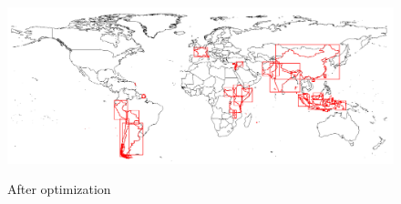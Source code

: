\documentclass[utf8]{article}
\begin{document}
\begin{large}
  \begin{figure}[h]
    \caption{After optimization}
    \includegraphics[width=\textwidth]{afterOpti.png}\label{fig:afteropti}
  \end{figure}


\end{large}
\end{document}
